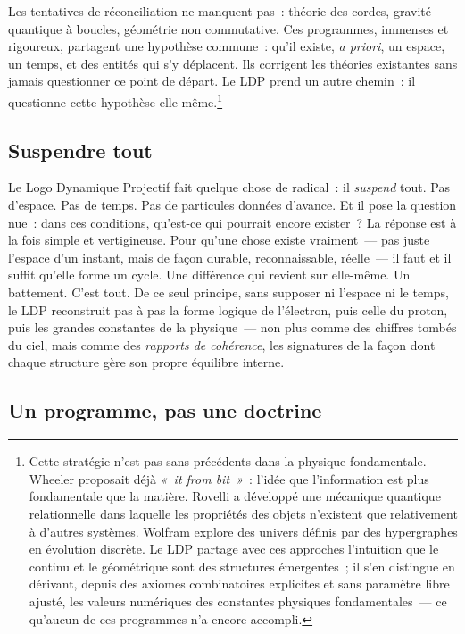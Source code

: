 \documentclass[12pt, a4paper, openright]{book}
\begin{document}
\medskip

Les tentatives de réconciliation ne manquent pas~: théorie des cordes, gravité quantique à boucles, géométrie non commutative. Ces programmes, immenses et rigoureux, partagent une hypothèse commune~: qu'il existe, \emph{a priori}, un espace, un temps, et des entités qui s'y déplacent. Ils corrigent les théories existantes sans jamais questionner ce point de départ. Le LDP prend un autre chemin~: il questionne cette hypothèse elle-même.\footnote{Cette stratégie n'est pas sans précédents dans la physique fondamentale. Wheeler proposait déjà \emph{«~it from bit~»}~: l'idée que l'information est plus fondamentale que la matière. Rovelli a développé une mécanique quantique relationnelle dans laquelle les propriétés des objets n'existent que relativement à d'autres systèmes. Wolfram explore des univers définis par des hypergraphes en évolution discrète. Le LDP partage avec ces approches l'intuition que le continu et le géométrique sont des structures émergentes~; il s'en distingue en dérivant, depuis des axiomes combinatoires explicites et sans paramètre libre ajusté, les valeurs numériques des constantes physiques fondamentales~--- ce qu'aucun de ces programmes n'a encore accompli.}

\subsection*{Suspendre tout}

Le Logo Dynamique Projectif fait quelque chose de radical~: il \emph{suspend} tout. Pas d'espace. Pas de temps. Pas de particules données d'avance. Et il pose la question nue~: dans ces conditions, qu'est-ce qui pourrait encore exister~? La réponse est à la fois simple et vertigineuse. Pour qu'une chose existe vraiment~--- pas juste l'espace d'un instant, mais de façon durable, reconnaissable, réelle~--- il faut et il suffit qu'elle forme un cycle. Une différence qui revient sur elle-même. Un battement. C'est tout. De ce seul principe, sans supposer ni l'espace ni le temps, le LDP reconstruit pas à pas la forme logique de l'électron, puis celle du proton, puis les grandes constantes de la physique~--- non plus comme des chiffres tombés du ciel, mais comme des \emph{rapports de cohérence}, les signatures de la façon dont chaque structure gère son propre équilibre interne.

\subsection*{Un programme, pas une doctrine}
\end{document}
